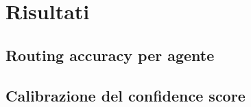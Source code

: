 \section{Risultati}
\label{sec:eval-risultati}
%

\subsection{Routing accuracy per agente}
\label{subsec:eval-routing-accuracy}

%

\subsection{Calibrazione del confidence score}
\label{subsec:eval-confidence-cal}

%

